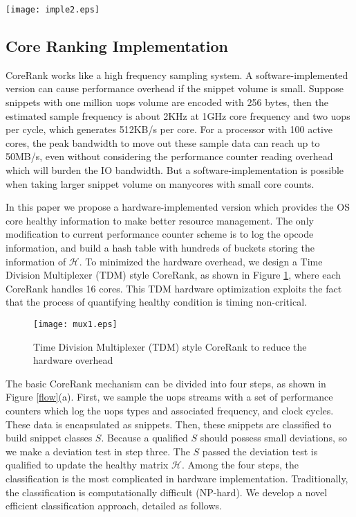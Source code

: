 \begin{figure*}[t]
  \centering
  \texttt{[image: imple2.eps]}\\
  \caption{CoreRank implementation}\label{flow}
\end{figure*}

\subsection{Core Ranking Implementation}
CoreRank works like a high frequency sampling system. A software-implemented version can cause performance overhead  if the snippet volume is small. Suppose snippets with one million uops volume are encoded with 256 bytes, then the estimated sample frequency is about 2KHz at 1GHz core frequency and two uops per cycle, which generates 512KB/s per core. For a processor with 100 active cores, the peak bandwidth to move out these sample data can reach up to 50MB/s, even without considering the performance counter reading overhead which will burden the IO bandwidth. But a software-implementation is possible when taking larger snippet volume on manycores with small core counts.

In this paper we propose a hardware-implemented version which provides the OS core healthy information to make better resource management.  The only modification to current performance counter scheme is to log the opcode information, and build a hash table with hundreds of buckets storing the information of $\mathcal{H}$. To minimized the hardware overhead, we design a Time Division Multiplexer (TDM) style CoreRank, as shown in Figure \ref{mux}, where each CoreRank handles 16 cores.  This TDM hardware optimization exploits the fact that the process of quantifying healthy condition is timing non-critical.

\begin{figure}[t]
  \centering
  \texttt{[image: mux1.eps]}\\
  \caption{Time Division Multiplexer (TDM) style CoreRank to reduce the hardware overhead}\label{mux}
\end{figure}

The basic CoreRank mechanism can be divided into four steps, as shown in Figure \ref{flow}(a). First, we sample the uops streams with a set of performance counters which log the uops types and associated frequency, and clock cycles. These data is encapsulated as snippets.  Then, these snippets are classified to build snippet classes $S$. Because a qualified $S$ should possess small deviations, so we make a deviation test in step three. The $S$ passed the deviation test is qualified to update the healthy matrix $\mathcal{H}$.  Among the four steps, the classification is the most complicated in hardware implementation.  Traditionally, the classification is computationally difficult (NP-hard). We develop a novel efficient classification approach, detailed as follows.

